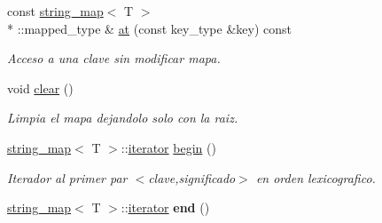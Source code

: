 \begin{DoxyCompactItemize}
\item 
const \hyperlink{classstring__map}{string\+\_\+map}$<$ T $>$\\*
\+::mapped\+\_\+type \& \hyperlink{classstring__map_a26b3ded1c1736abff4580e994fab843e}{at} (const key\+\_\+type \&key) const 
\begin{DoxyCompactList}\small\item\em Acceso a una clave sin modificar mapa. \end{DoxyCompactList}\item 
void \hyperlink{classstring__map_a5e0460b9c8c6f7c6e5f76e0112446842}{clear} ()
\begin{DoxyCompactList}\small\item\em Limpia el mapa dejandolo solo con la raiz. \end{DoxyCompactList}\item 
\hyperlink{classstring__map}{string\+\_\+map}$<$ T $>$\+::\hyperlink{classstring__map_1_1iterator}{iterator} \hyperlink{classstring__map_aced2bd9493475515f3dc765a379484bd}{begin} ()
\begin{DoxyCompactList}\small\item\em Iterador al primer par $<$clave,significado$>$ en orden lexicografico. \end{DoxyCompactList}\item 
\hypertarget{classstring__map_ab063b2f78945d192c5ef3ccc68db8e80}{\hyperlink{classstring__map}{string\+\_\+map}$<$ T $>$\+::\hyperlink{classstring__map_1_1iterator}{iterator} {\bfseries end} ()}\label{classstring__map_ab063b2f78945d192c5ef3ccc68db8e80}


\end{DoxyCompactItemize}
